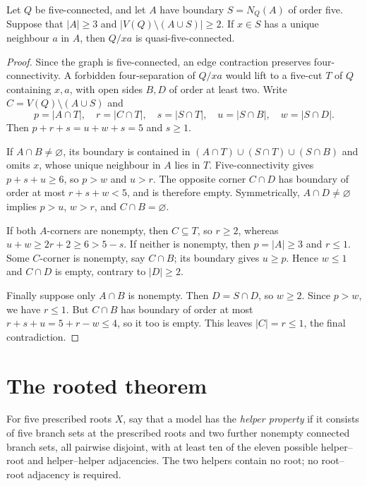 \begin{lemma}\label{lem:quasi}
Let $Q$ be five-connected, and let $A$ have boundary $S=N_Q(A)$ of
order five. Suppose that $|A|\ge3$ and
$|V(Q)\setminus(A\cup S)|\ge2$. If $x\in S$ has a unique neighbour
$a$ in $A$, then $Q/xa$ is quasi-five-connected.
\end{lemma}

\begin{proof}
Since the graph is five-connected, an edge contraction preserves
four-connectivity. A forbidden four-separation of $Q/xa$ would lift to
a five-cut $T$ of $Q$ containing
$x,a$, with open sides $B,D$ of order at least two. Write
$C=V(Q)\setminus(A\cup S)$ and
\[
 p=|A\cap T|,\quad r=|C\cap T|,\quad s=|S\cap T|,\quad
 u=|S\cap B|,\quad w=|S\cap D|.
\]
Then $p+r+s=u+w+s=5$ and $s\ge1$.

If $A\cap B\ne\varnothing$, its boundary is contained in
$(A\cap T)\cup(S\cap T)\cup(S\cap B)$ and omits $x$, whose unique
neighbour in $A$ lies in $T$. Five-connectivity gives $p+s+u\ge6$,
so $p>w$ and $u>r$. The opposite corner $C\cap D$ has boundary of
order at most $r+s+w<5$, and is therefore empty. Symmetrically,
$A\cap D\ne\varnothing$ implies $p>u$, $w>r$, and
$C\cap B=\varnothing$.

If both $A$-corners are nonempty, then $C\subseteq T$, so $r\ge2$,
whereas $u+w\ge2r+2\ge6>5-s$. If neither is nonempty, then
$p=|A|\ge3$ and $r\le1$. Some $C$-corner is nonempty, say $C\cap B$;
its boundary gives $u\ge p$. Hence $w\le1$ and $C\cap D$ is empty,
contrary to $|D|\ge2$.

Finally suppose only $A\cap B$ is nonempty. Then $D=S\cap D$, so
$w\ge2$. Since $p>w$, we have $r\le1$. But $C\cap B$ has boundary
of order at most $r+s+u=5+r-w\le4$, so it too is empty. This leaves
$|C|=r\le1$, the final contradiction.
\end{proof}

\section{The rooted theorem}\label{sec:helper}

For five prescribed roots $X$, say that a model has the
\emph{helper property} if it consists of five branch sets at the
prescribed roots and two further nonempty connected branch sets, all
pairwise disjoint, with at least ten of the eleven possible helper--root
and helper--helper adjacencies. The two helpers contain no root;
no root--root adjacency is required.

